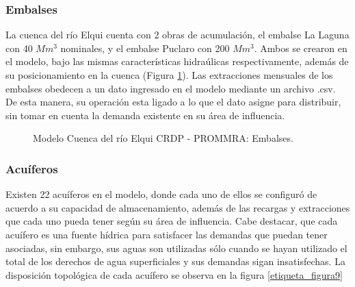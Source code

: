 \documentclass[11pt,]{article}
\begin{document}
\subsubsection{Embalses}\bigskip

La cuenca del río Elqui cuenta con 2 obras de acumulación, el embalse La Laguna con 40 $Mm^3$ nominales, y el embalse Puclaro con 200 $Mm^3$. Ambos se crearon en el modelo, bajo las mismas características hidraúlicas respectivamente, además de su posicionamiento en la cuenca (Figura \ref{etiqueta_figura8}). Las extracciones mensuales de los embalses obedecen a un dato ingresado en el modelo mediante un archivo .csv. De esta manera, su operación esta ligado a lo que el dato asigne para distribuir, sin tomar en cuenta la demanda existente en su área de influencia.


\begin{figure}[H]
\begin{center}
\caption{Modelo Cuenca del río Elqui CRDP - PROMMRA: Embalses.}
\label{etiqueta_figura8}
\end{center}
\end{figure}


\subsubsection{Acuíferos}\bigskip

Existen 22 acuíferos en el modelo, donde cada uno de ellos se configuró de acuerdo a su capacidad de almacenamiento, además de las recargas y extracciones que cada uno pueda tener según su área de influencia. Cabe destacar, que cada acuífero es una fuente hídrica para satisfacer las demandas que puedan tener asociadas, sin embargo, sus aguas son utilizadas sólo  cuando se hayan utilizado el total de los derechos de agua superficiales y sus demandas sigan insatisfechas. La disposición topológica de cada acuífero se observa en la figura \ref{etiqueta_figura9}
\end{document}
